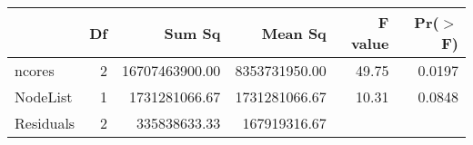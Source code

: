 \begin{table}[ht]
\centering
\begin{tabular}{lrrrrr}
  \hline
 & Df & Sum Sq & Mean Sq & F value & Pr($>$F) \\ 
  \hline
ncores & 2 & 16707463900.00 & 8353731950.00 & 49.75 & 0.0197 \\ 
  NodeList & 1 & 1731281066.67 & 1731281066.67 & 10.31 & 0.0848 \\ 
  Residuals & 2 & 335838633.33 & 167919316.67 &  &  \\ 
   \hline
\end{tabular}
\end{table}
